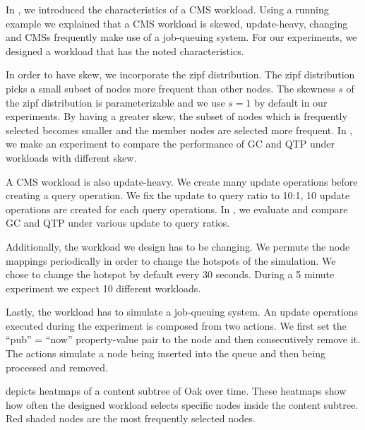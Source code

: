 \documentclass[abstracton,12pt]{scrartcl}
\theoremstyle{definition}
\begin{document}
In , we introduced the characteristics of a CMS
workload. Using a running example we explained that a CMS workload is skewed,
update-heavy, changing and CMSs frequently make use of a job-queuing system.
For our experiments, we designed a workload that has the noted characteristics.

In order to have skew, we incorporate the zipf distribution. The zipf
distribution picks a small subset of nodes more frequent than other nodes. The
skewness $s$ of the zipf distribution is parameterizable and we use $s=1$ by
default in our experiments. By having a greater skew, the subset of nodes which
is frequently selected becomes smaller and the member nodes are selected more
frequent. In , we make an experiment to compare the performance
of GC and QTP under workloads with different skew.

A CMS workload is also update-heavy. We create many update operations before
creating a query operation. We fix the update to query ratio to 10:1, 10 update
operations are created for each query operations. In
, we evaluate and compare GC and QTP under various
update to query ratios.

Additionally, the workload we design has to be changing. We permute the node
mappings periodically in order to change the hotspots of the simulation. We
chose to change the hotspot by default every 30 seconds. During a 5 minute
experiment we expect 10 different workloads.

Lastly, the workload has to simulate a job-queuing system. An update operations
executed  during the experiment is composed from two actions. We first set the
``pub'' = ``now'' property-value pair to the node and then consecutively remove
it. The actions simulate a node being inserted into the queue and then being
processed and removed.

 depicts heatmaps of a content subtree of Oak over time.
These heatmaps show how often the designed workload selects specific nodes
inside the content subtree. Red shaded nodes are the most frequently selected nodes.


\end{document}
